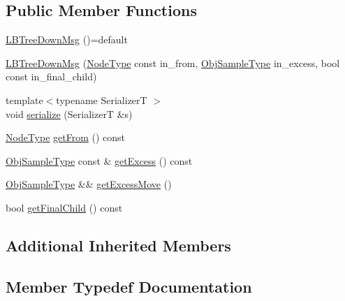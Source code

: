 \subsection*{Public Member Functions}
\begin{DoxyCompactItemize}
\item 
\hyperlink{structvt_1_1vrt_1_1collection_1_1lb_1_1_l_b_tree_down_msg_ab98ef9e015d68d2d6f8491d05eb1bfd4}{L\+B\+Tree\+Down\+Msg} ()=default
\item 
\hyperlink{structvt_1_1vrt_1_1collection_1_1lb_1_1_l_b_tree_down_msg_a4728ca0d578d08d8e90862a07ddf1b53}{L\+B\+Tree\+Down\+Msg} (\hyperlink{namespacevt_a866da9d0efc19c0a1ce79e9e492f47e2}{Node\+Type} const in\+\_\+from, \hyperlink{structvt_1_1vrt_1_1collection_1_1lb_1_1_hier_l_b_types_a597a60d517207b90e8c7984eac434e8f}{Obj\+Sample\+Type} in\+\_\+excess, bool const in\+\_\+final\+\_\+child)
\item 
{\footnotesize template$<$typename SerializerT $>$ }\\void \hyperlink{structvt_1_1vrt_1_1collection_1_1lb_1_1_l_b_tree_down_msg_a13f9e708fad12e306592dcbc1bf66171}{serialize} (SerializerT \&s)
\item 
\hyperlink{namespacevt_a866da9d0efc19c0a1ce79e9e492f47e2}{Node\+Type} \hyperlink{structvt_1_1vrt_1_1collection_1_1lb_1_1_l_b_tree_down_msg_af1656dcca58e338b16f856a45eb49dd3}{get\+From} () const
\item 
\hyperlink{structvt_1_1vrt_1_1collection_1_1lb_1_1_hier_l_b_types_a597a60d517207b90e8c7984eac434e8f}{Obj\+Sample\+Type} const  \& \hyperlink{structvt_1_1vrt_1_1collection_1_1lb_1_1_l_b_tree_down_msg_a262abc83d3f5df7e3971d8a837689335}{get\+Excess} () const
\item 
\hyperlink{structvt_1_1vrt_1_1collection_1_1lb_1_1_hier_l_b_types_a597a60d517207b90e8c7984eac434e8f}{Obj\+Sample\+Type} \&\& \hyperlink{structvt_1_1vrt_1_1collection_1_1lb_1_1_l_b_tree_down_msg_a73e7f5d97152582a54d54b634b9e0486}{get\+Excess\+Move} ()
\item 
bool \hyperlink{structvt_1_1vrt_1_1collection_1_1lb_1_1_l_b_tree_down_msg_aab94923c1ba77ba3fc30f5de51706b3e}{get\+Final\+Child} () const
\end{DoxyCompactItemize}
\subsection*{Additional Inherited Members}


\subsection{Member Typedef Documentation}
\mbox{\label{structvt_1_1vrt_1_1collection_1_1lb_1_1_l_b_tree_down_msg_a7027506c735fa124564be187c5e6fb5d}} 
